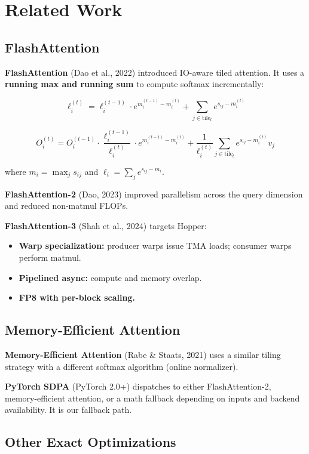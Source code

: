 \section{Related Work}

\subsection{FlashAttention}

\textbf{FlashAttention} (Dao et al., 2022) introduced IO-aware tiled attention. 
It uses a \textbf{running max and running sum} to compute softmax incrementally:

\[
\ell_i^{(t)} = \ell_i^{(t-1)} \cdot e^{m_i^{(t-1)} - m_i^{(t)}} + \sum_{j \in \text{tile}_t} e^{s_{ij} - m_i^{(t)}}
\tag{2.1}
\]

\[
O_i^{(t)} = O_i^{(t-1)} \cdot \frac{\ell_i^{(t-1)}}{\ell_i^{(t)}} \cdot e^{m_i^{(t-1)} - m_i^{(t)}} + \frac{1}{\ell_i^{(t)}} \sum_{j \in \text{tile}_t} e^{s_{ij} - m_i^{(t)}} v_j
\tag{2.2}
\]

where $m_i = \max_j s_{ij}$ and $\ell_i = \sum_j e^{s_{ij} - m_i}$.

\textbf{FlashAttention-2} (Dao, 2023) improved parallelism across the query 
dimension and reduced non-matmul FLOPs.

\textbf{FlashAttention-3} (Shah et al., 2024) targets Hopper:

\begin{itemize}
\item \textbf{Warp specialization:} producer warps issue TMA loads; consumer warps
  perform matmul.
\item \textbf{Pipelined async:} compute and memory overlap.
\item \textbf{FP8 with per-block scaling.}

\end{itemize}
\subsection{Memory-Efficient Attention}

\textbf{Memory-Efficient Attention} (Rabe \& Staats, 2021) uses a similar tiling 
strategy with a different softmax algorithm (online normalizer).

\textbf{PyTorch SDPA} (PyTorch 2.0+) dispatches to either FlashAttention-2, 
memory-efficient attention, or a math fallback depending on inputs and 
backend availability. It is our fallback path.

\subsection{Other Exact Optimizations}

